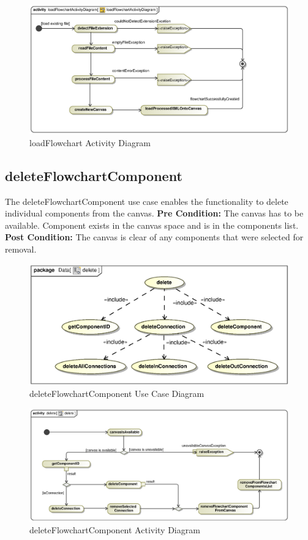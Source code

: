 \documentclass[12pt,a4paper,titlepage]{article}
\begin{document}
\begin{figure}[H]
  \centering
\includegraphics[width=500px]{loadFlowchartActivityDiagram.eps}
\caption{loadFlowchart Activity Diagram}
\end{figure}

\newpage
\subsection{deleteFlowchartComponent}
The deleteFlowchartComponent use case enables the functionality to delete individual components from the canvas.\newline\newline
\textbf{Pre Condition:} The canvas has to be available. Component exists in the canvas space and is in the components list.\newline\newline
\textbf{Post Condition:} The canvas is clear of any components that were selected for removal.

\begin{figure}[H]
  \centering
\includegraphics[width=500px]{delete.eps}
\caption{deleteFlowchartComponent Use Case Diagram}
\end{figure}

\begin{figure}[H]
  \centering
\includegraphics[width=500px]{deleteAct.eps}
\caption{deleteFlowchartComponent Activity Diagram}
\end{figure}
\end{document}
